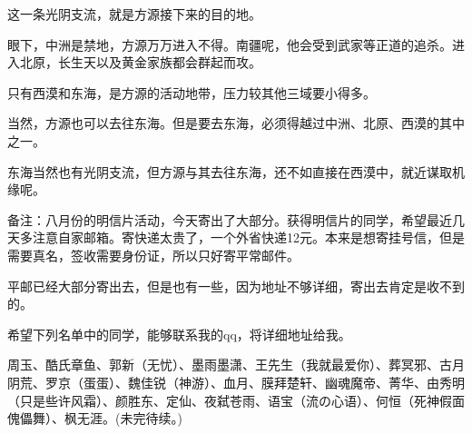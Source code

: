 \begin{this_body}
这一条光阴支流，就是方源接下来的目的地。

眼下，中洲是禁地，方源万万进入不得。南疆呢，他会受到武家等正道的追杀。进入北原，长生天以及黄金家族都会群起而攻。

只有西漠和东海，是方源的活动地带，压力较其他三域要小得多。

当然，方源也可以去往东海。但是要去东海，必须得越过中洲、北原、西漠的其中之一。

东海当然也有光阴支流，但方源与其去往东海，还不如直接在西漠中，就近谋取机缘呢。

备注：八月份的明信片活动，今天寄出了大部分。获得明信片的同学，希望最近几天多注意自家邮箱。寄快递太贵了，一个外省快递12元。本来是想寄挂号信，但是需要真名，签收需要身份证，所以只好寄平常邮件。

平邮已经大部分寄出去，但是也有一些，因为地址不够详细，寄出去肯定是收不到的。

希望下列名单中的同学，能够联系我的qq，将详细地址给我。

周玉、酷氏章鱼、郭新（无忧）、墨雨墨潇、王先生（我就最爱你）、葬冥邪、古月阴荒、罗京（蛋蛋）、魏佳锐（神游）、血月、膜拜楚轩、幽魂魔帝、菁华、由秀明（只是些许风霜）、颜胜东、定仙、夜弑苍雨、语宝（流の心语）、何恒（死神假面傀儡舞）、枫无涯。(未完待续。)

\end{this_body}

